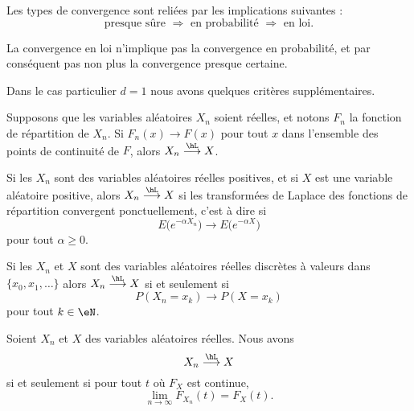 \begin{proposition} \label{PropJFVJDuX}
    Les types de convergence sont reliées par les implications suivantes :
    \begin{equation}
        \text{presque sûre }\Rightarrow\text{ en probabilité }\Rightarrow\text{ en loi}.
    \end{equation}
\end{proposition}
La convergence en loi n'implique pas la convergence en probabilité, et par conséquent pas non plus la convergence presque certaine.

Dans le cas particulier \( d=1\) nous avons quelques critères supplémentaires. 

\begin{proposition}     \label{PropoFnrepCvL}
    Supposons que les variables aléatoires \( X_n\) soient réelles, et notons \( F_n\) la fonction de répartition de \( X_n\). Si \( F_n(x)\to F(x)\) pour tout \( x\) dans l'ensemble des points de continuité de \( F\), alors \( X_n\stackrel{\hL}{\longrightarrow}X\).
\end{proposition}

\begin{proposition}
    Si les \( X_n\) sont des variables aléatoires réelles positives, et si \( X\) est une variable aléatoire positive, alors \( X_n\stackrel{\hL}{\longrightarrow}X\) si les transformées de Laplace des fonctions de répartition convergent ponctuellement, c'est à dire si
    \begin{equation}
        E\big(  e^{-\alpha X_n} \big)\to E\big(  e^{-\alpha X} \big)
    \end{equation}
    pour tout \( \alpha\geq 0\).
\end{proposition}

\begin{proposition}
    Si les \( X_n\) et \( X\) sont des variables aléatoires réelles discrètes à valeurs dans \( \{ x_0,x_1,\ldots \}\) alors \( X_n\stackrel{\hL}{\longrightarrow} X\) si et seulement si
    \begin{equation}
        P(X_n=x_k)\to P(X=x_k)
    \end{equation}
    pour tout \( k\in\eN\).
\end{proposition}

\begin{proposition}     \label{PropXncvXFXcvFxt}
    Soient \( X_n\) et \( X\) des variables aléatoires réelles. Nous avons
    \begin{equation}
        X_n\stackrel{\hL}{\longrightarrow}X
    \end{equation}
    si et seulement si pour tout \( t\) où \( F_X\) est continue,
    \begin{equation}
        \lim_{n\to \infty} F_{X_n}(t)=F_X(t).
    \end{equation}
\end{proposition}

